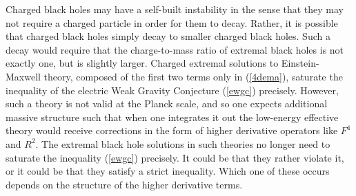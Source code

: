 \documentclass[11pt,a4paper]{article}
\numberwithin{equation}{section}
\numberwithin{table}{section}\setlength{\multlinegap}{25pt}
\begin{document}
Charged black holes may have a self-built instability in the sense that they may not require a charged particle in order for them to decay. Rather, it is possible that charged black holes simply decay to smaller charged black holes. Such a decay would require that the charge-to-mass ratio of extremal black holes is not exactly one, but is slightly larger. Charged extremal solutions to Einstein-Maxwell theory, composed of the first two terms only in (\ref{4dema}), saturate the inequality of the electric Weak Gravity Conjecture (\ref{ewgc}) precisely. However, such a theory is not valid at the Planck scale, and so one expects additional massive structure such that when one integrates it out the low-energy effective theory would receive corrections in the form of higher derivative operators like $F^4$ and $R^2$. The extremal black hole solutions in such theories no longer need to saturate the inequality (\ref{ewgc}) precisely. It could be that they rather violate it, or it could be that they satisfy a strict inequality. Which one of these occurs depends on the structure of the higher derivative terms. 
\end{document}
